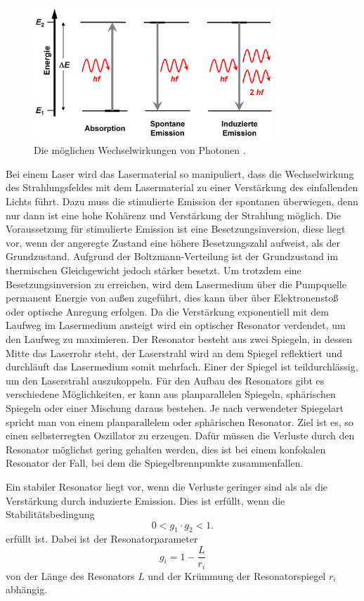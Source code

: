 \begin{figure}[H]
  \centering
  \includegraphics[width=9cm]{Emission.png}
  \caption{Die möglichen Wechselwirkungen von Photonen \cite{seos}.}
  \label{fig:Emission}
\end{figure}

Bei einem Laser wird das Lasermaterial so manipuliert, dass die Wechselwirkung des Strahlungsfeldes
mit dem Lasermaterial zu einer Verstärkung des einfallenden Lichts führt. Dazu muss die stimulierte
Emission der spontanen überwiegen, denn nur dann ist eine hohe Kohärenz und Verstärkung der Strahlung möglich.
Die Voraussetzung für stimulierte Emission ist eine Besetzungsinversion, diese liegt vor, wenn der angeregte Zustand
eine höhere Besetzungszahl aufweist, als der Grundzustand. Aufgrund der Boltzmann-Verteilung ist der Grundzustand im
thermischen Gleichgewicht jedoch stärker besetzt. Um trotzdem eine Besetzungsinversion zu erreichen, wird dem
Lasermedium über die Pumpquelle permanent Energie von außen zugeführt, dies kann über über Elektronenstoß
oder optische Anregung erfolgen.
Da die Verstärkung exponentiell mit dem Laufweg im Lasermedium ansteigt wird ein optischer Resonator verdendet, um den
Laufweg zu maximieren. Der Resonator besteht aus zwei Spiegeln, in dessen Mitte das Laserrohr steht, der Laserstrahl wird an
dem Spiegel reflektiert und durchläuft das Lasermedium somit mehrfach. Einer der Spiegel ist teildurchlässig, um den Laserstrahl
auszukoppeln. Für den Aufbau des Resonators gibt es verschiedene Möglichkeiten, er kann aus planparallelen Spiegeln, sphärischen
Spiegeln oder einer Mischung daraus bestehen. Je nach verwendeter Spiegelart spricht man von einem planparallelem oder sphärischen
Resonator. Ziel ist es, so einen selbsterregten Oszillator zu erzeugen. Dafür müssen die Verluste durch den Resonator möglichst gering
gehalten werden, dies ist bei einem konfokalen Resonator der Fall, bei dem die Spiegelbrennpunkte zusammenfallen.

Ein stabiler Resonator liegt vor, wenn die Verluste geringer sind als als die Verstärkung durch induzierte Emission.
Dies ist erfüllt, wenn die Stabilitätsbedingung
\begin{equation}
  0< g_1 \cdot g_2 <1.
  \label{eqn:stab1}
\end{equation}
erfüllt ist.
Dabei ist der Resonatorparameter
\begin{equation}
  g_i = 1- \frac{L}{r_i}
    \label{eqn:stab2}
\end{equation}
von der Länge des Resonators $L$ und der Krümmung der Resonatorspiegel $r_i$ abhängig.

